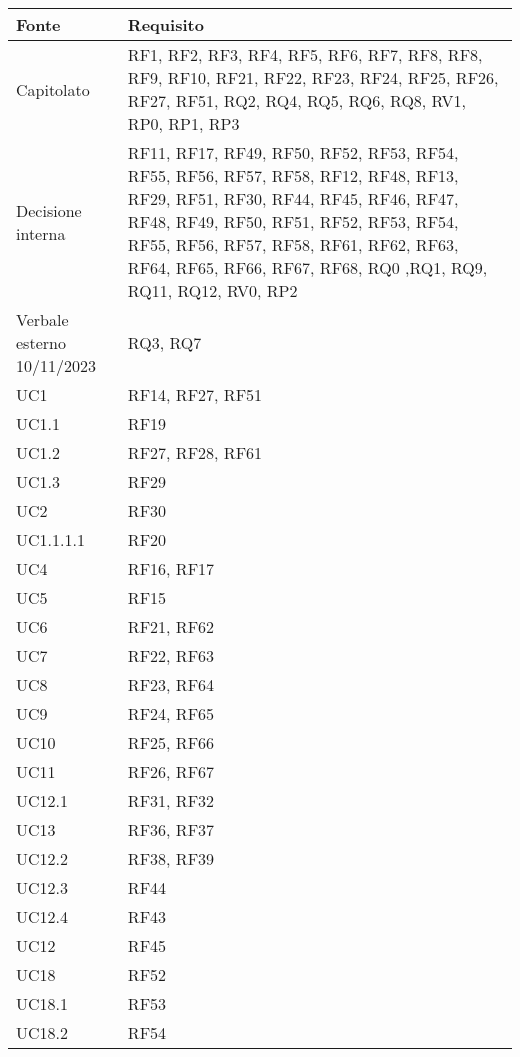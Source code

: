 \begin{center}
  \begin{longtable}{|C{5cm}|C{5cm}|}
    \hline
    \textbf{Fonte} & \textbf{Requisito} \\
    \hline
    Capitolato & RF1, RF2, RF3, RF4, RF5, RF6, RF7, RF8, RF8, RF9, RF10, RF21, RF22, RF23, RF24, RF25, RF26, RF27, RF51, RQ2, RQ4, RQ5, RQ6, RQ8, RV1, RP0, RP1, RP3  \\
    \hline
    Decisione interna & RF11, RF17, RF49, RF50, RF52, RF53, RF54, RF55, RF56, RF57, RF58, RF12, RF48, RF13, RF29, RF51, RF30, RF44, RF45, RF46, RF47, RF48, RF49, RF50, RF51, RF52, RF53, RF54, RF55, RF56, RF57, RF58, RF61, RF62, RF63, RF64, RF65, RF66, RF67, RF68, RQ0 ,RQ1, RQ9, RQ11, RQ12, RV0, RP2 \\
    \hline
    Verbale esterno 10/11/2023 & RQ3, RQ7 \\
    \hline
    UC1 & RF14, RF27, RF51 \\
    \hline
    UC1.1 & RF19  \\
    \hline
    UC1.2 & RF27, RF28, RF61 \\
    \hline
    UC1.3 &  RF29 \\
    \hline
    UC2 & RF30 \\
    \hline
    UC1.1.1.1 & RF20 \\
    \hline
    UC4 & RF16, RF17 \\
    \hline
    UC5 & RF15 \\
    \hline
    UC6 & RF21, RF62\\
    \hline
    UC7 & RF22, RF63 \\
    \hline
    UC8 & RF23, RF64 \\
    \hline
    UC9 & RF24, RF65 \\
    \hline
    UC10 & RF25, RF66 \\
    \hline
    UC11 & RF26, RF67 \\
    \hline
    UC12.1 & RF31, RF32 \\
    \hline
    UC13 & RF36, RF37 \\
    \hline
    UC12.2 &  RF38, RF39 \\
    \hline
    UC12.3 & RF44 \\
    \hline
    UC12.4 & RF43 \\
    \hline
    UC12 & RF45 \\
    \hline
    UC18 & RF52 \\
    \hline
    UC18.1 & RF53 \\
    \hline
    UC18.2 & RF54 \\

\end{longtable}
\end{center}
